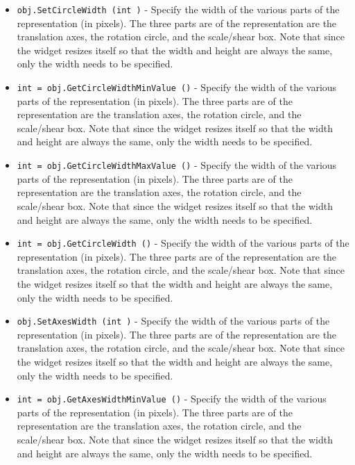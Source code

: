 \begin{itemize}
\item  \verb|obj.SetCircleWidth (int )| -  Specify the width of the various parts of the representation (in
 pixels).  The three parts are of the representation are the translation
 axes, the rotation circle, and the scale/shear box. Note that since the
 widget resizes itself so that the width and height are always the
 same, only the width needs to be specified.

\item  \verb|int = obj.GetCircleWidthMinValue ()| -  Specify the width of the various parts of the representation (in
 pixels).  The three parts are of the representation are the translation
 axes, the rotation circle, and the scale/shear box. Note that since the
 widget resizes itself so that the width and height are always the
 same, only the width needs to be specified.

\item  \verb|int = obj.GetCircleWidthMaxValue ()| -  Specify the width of the various parts of the representation (in
 pixels).  The three parts are of the representation are the translation
 axes, the rotation circle, and the scale/shear box. Note that since the
 widget resizes itself so that the width and height are always the
 same, only the width needs to be specified.

\item  \verb|int = obj.GetCircleWidth ()| -  Specify the width of the various parts of the representation (in
 pixels).  The three parts are of the representation are the translation
 axes, the rotation circle, and the scale/shear box. Note that since the
 widget resizes itself so that the width and height are always the
 same, only the width needs to be specified.

\item  \verb|obj.SetAxesWidth (int )| -  Specify the width of the various parts of the representation (in
 pixels).  The three parts are of the representation are the translation
 axes, the rotation circle, and the scale/shear box. Note that since the
 widget resizes itself so that the width and height are always the
 same, only the width needs to be specified.

\item  \verb|int = obj.GetAxesWidthMinValue ()| -  Specify the width of the various parts of the representation (in
 pixels).  The three parts are of the representation are the translation
 axes, the rotation circle, and the scale/shear box. Note that since the
 widget resizes itself so that the width and height are always the
 same, only the width needs to be specified.


\end{itemize}
